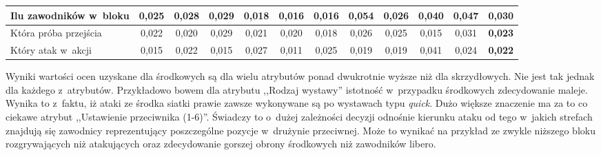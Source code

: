 \documentclass[a4paper,twoside,12pt]{book}
\newcommand{\obcy}[1]{\emph{#1}}
\renewcommand{\ang}[1]{{\selectlanguage{british}\obcy{#1}}}
\begin{document}
\begin{table}
\begin{adjustbox}{angle=90}
\begin{tabular}{|l|c|c|c|c|c|c|c|c|c|c|c|}
Ilu zawodników w~bloku & 0,025 & 0,028 & 0,029 & 0,018 & 0,016 & 0,016 & 0,054 & 0,026 & 0,040 & 0,047 & \textbf{0,030} \\ \hline
Która próba przejścia & 0,022 & 0,020 & 0,029 & 0,021 & 0,020 & 0,018 & 0,026 & 0,025 & 0,015 & 0,031 & \textbf{0,023} \\ \hline
Który atak w~akcji & 0,015 & 0,022 & 0,015 & 0,027 & 0,011 & 0,025 & 0,019 & 0,019 & 0,041 & 0,024 & \textbf{0,022} \\ \hline
\end{tabular}
\end{adjustbox}
\end{table}

Wyniki wartości ocen uzyskane dla środkowych są dla wielu atrybutów ponad dwukrotnie wyższe niż dla skrzydłowych. Nie jest tak jednak dla każdego z~atrybutów. Przykładowo bowem dla atrybutu ,,Rodzaj wystawy'' istotność w~przypadku środkowych zdecydowanie maleje. Wynika to z~faktu, iż ataki ze środka siatki prawie zawsze wykonywane są po wystawach typu \ang{quick}. Dużo większe znaczenie ma za to co ciekawe atrybut ,,Ustawienie przeciwnika (1-6)''. Świadczy to o~dużej zależności decyzji odnośnie kierunku ataku od tego w~jakich strefach znajdują się zawodnicy reprezentujący poszczególne pozycje w~drużynie przeciwnej. Może to wynikać na przykład ze zwykle niższego bloku rozgrywających niż atakujących oraz zdecydowanie gorszej obrony środkowych niż zawodników libero. 
\end{document}
